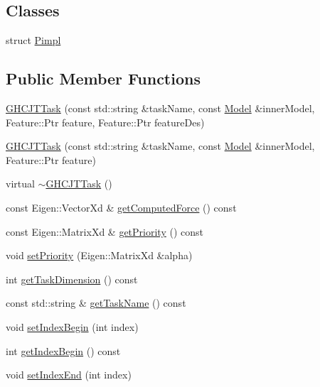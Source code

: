 \subsection*{Classes}
\begin{DoxyCompactItemize}
\item 
struct \hyperlink{structgocra_1_1GHCJTTask_1_1Pimpl}{Pimpl}
\end{DoxyCompactItemize}
\subsection*{Public Member Functions}
\begin{DoxyCompactItemize}
\item 
\hyperlink{classgocra_1_1GHCJTTask_a9161a72cfe5261e5a3580fba578ef23f}{G\+H\+C\+J\+T\+Task} (const std\+::string \&task\+Name, const \hyperlink{classocra_1_1Model}{Model} \&inner\+Model, Feature\+::\+Ptr feature, Feature\+::\+Ptr feature\+Des)
\item 
\hyperlink{classgocra_1_1GHCJTTask_a45a0f844d1e8e3a2d500da01a6606a03}{G\+H\+C\+J\+T\+Task} (const std\+::string \&task\+Name, const \hyperlink{classocra_1_1Model}{Model} \&inner\+Model, Feature\+::\+Ptr feature)
\item 
virtual \hyperlink{classgocra_1_1GHCJTTask_a258ac19e0b4a3aab26b4aebfeb2c26d8}{$\sim$\+G\+H\+C\+J\+T\+Task} ()
\item 
const Eigen\+::\+Vector\+Xd \& \hyperlink{classgocra_1_1GHCJTTask_a088d67ee49cbdc57ad2b77e2d89afae0}{get\+Computed\+Force} () const
\item 
const Eigen\+::\+Matrix\+Xd \& \hyperlink{classgocra_1_1GHCJTTask_a3f9898bd47735158641a52ac36be2801}{get\+Priority} () const
\item 
void \hyperlink{classgocra_1_1GHCJTTask_a5dce074858a320d3277eb5e0c8fc1d0c}{set\+Priority} (Eigen\+::\+Matrix\+Xd \&alpha)
\item 
int \hyperlink{classgocra_1_1GHCJTTask_a7c7f6781003d4ecad41e65fd417ddf48}{get\+Task\+Dimension} () const
\item 
const std\+::string \& \hyperlink{classgocra_1_1GHCJTTask_ac382ad3227454bc831ce5930c7a7519a}{get\+Task\+Name} () const
\item 
void \hyperlink{classgocra_1_1GHCJTTask_adb7d719214756cc13927b3587b4e6219}{set\+Index\+Begin} (int index)
\item 
int \hyperlink{classgocra_1_1GHCJTTask_ab7732146f0db17c8a7b0f1c2d7c163a1}{get\+Index\+Begin} () const
\item 
void \hyperlink{classgocra_1_1GHCJTTask_a26739b301ace2b23b7217f5aa18afd5e}{set\+Index\+End} (int index)

\end{DoxyCompactItemize}
